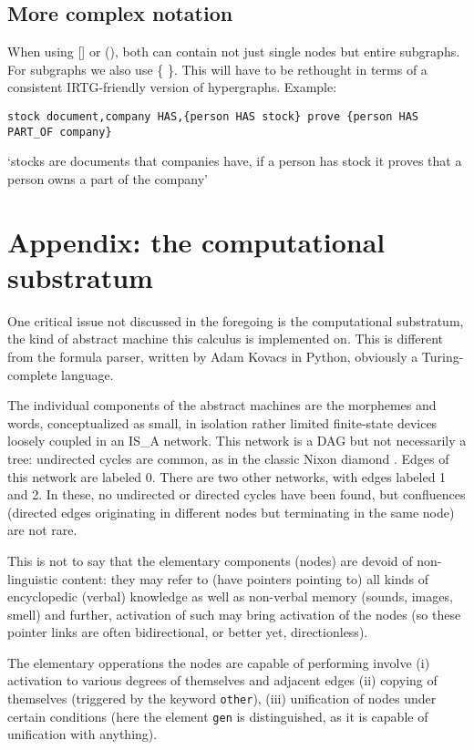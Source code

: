 \documentclass[11pt,bookmarks,bookmarksnumbered,naturalnames,plainpages=false,pdftex,colorlinks=true,urlcolor=blue,bookmarksdepth=subsection,plainpages=false]{paper}
\begin{document}
\subsection{More complex notation}\label{parens}

When using [] or (), both can contain not just single nodes but entire
subgraphs. For subgraphs we also use \{ \}. This will have to be rethought in
terms of a consistent IRTG-friendly version of hypergraphs. Example:

\begin{verbatim}
stock document,company HAS,{person HAS stock} prove {person HAS PART_OF company}
\end{verbatim}

\noindent
`stocks are documents that companies have, if a person has stock it proves
that a person owns a part of the company'


\section*{Appendix: the computational substratum}

One critical issue not discussed in the foregoing is the computational
substratum, the kind of abstract machine this calculus is implemented on. This
is different from the formula parser, written by Adam Kovacs in Python,
obviously a Turing-complete language.

The individual components of the abstract machines are the morphemes and words,
conceptualized as small, in isolation rather limited finite-state devices
loosely coupled in an IS\_A network. This network is a DAG but not necessarily a tree: 
undirected cycles are common, as in the classic Nixon diamond
\citep{Reiter:1983}. Edges of this network are labeled 0. There are two other
networks, with edges labeled 1 and 2. In these, no undirected or directed 
cycles have been found, but confluences (directed edges originating in
different nodes but terminating in the same node) are not rare. 

This is not to say that the elementary components (nodes) are devoid of
non-linguistic content: they may refer to (have pointers pointing to) all
kinds of encyclopedic (verbal) knowledge as well as non-verbal memory (sounds,
images, smell) and further, activation of such may bring activation of the
nodes (so these pointer links are often bidirectional, or better yet,
directionless). 

The elementary opperations the nodes are capable of performing involve (i)
activation to various degrees of themselves and adjacent edges (ii) copying of
themselves (triggered by the keyword {\tt other}), (iii) unification of
nodes under certain conditions (here the element {\tt gen} is
distinguished, as it is capable of unification with anything).
\end{document}

